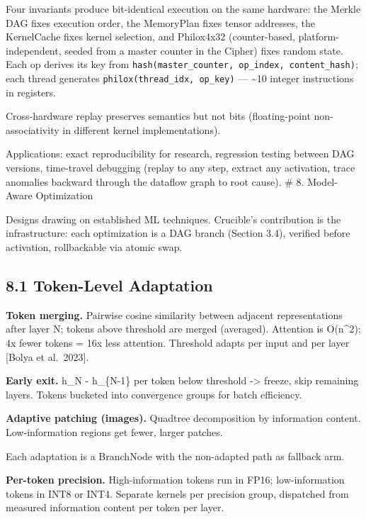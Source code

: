 Four invariants produce bit-identical execution on the same hardware: the Merkle DAG fixes execution order, the MemoryPlan fixes tensor addresses, the KernelCache fixes kernel selection, and Philox4x32 (counter-based, platform-independent, seeded from a master counter in the Cipher) fixes random state. Each op derives its key from \texttt{hash(master\_counter,\ op\_index,\ content\_hash)}; each thread generates \texttt{philox(thread\_idx,\ op\_key)} --- \textasciitilde10 integer instructions in registers.

Cross-hardware replay preserves semantics but not bits (floating-point non-associativity in different kernel implementations).

Applications: exact reproducibility for research, regression testing between DAG versions, time-travel debugging (replay to any step, extract any activation, trace anomalies backward through the dataflow graph to root cause).
\# 8. Model-Aware Optimization

Designs drawing on established ML techniques. Crucible's contribution is the infrastructure: each optimization is a DAG branch (Section 3.4), verified before activation, rollbackable via atomic swap.

\subsection{8.1 Token-Level Adaptation}\label{token-level-adaptation}

\textbf{Token merging.} Pairwise cosine similarity between adjacent representations after layer N; tokens above threshold are merged (averaged). Attention is O(n\^{}2); 4x fewer tokens = 16x less attention. Threshold adapts per input and per layer {[}Bolya et al.~2023{]}.

\textbf{Early exit.} \textbar\textbar h\_N - h\_\{N-1\}\textbar\textbar{} per token below threshold -\textgreater{} freeze, skip remaining layers. Tokens bucketed into convergence groups for batch efficiency.

\textbf{Adaptive patching (images).} Quadtree decomposition by information content. Low-information regions get fewer, larger patches.

Each adaptation is a BranchNode with the non-adapted path as fallback arm.

\textbf{Per-token precision.} High-information tokens run in FP16; low-information tokens in INT8 or INT4. Separate kernels per precision group, dispatched from measured information content per token per layer.

